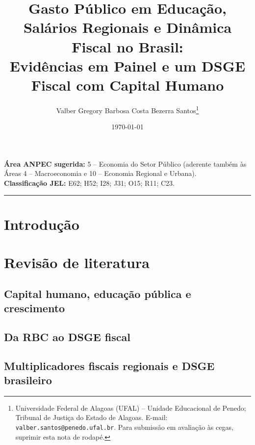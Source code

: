 \documentclass[12pt,a4paper]{article}
\title{\textbf{Gasto P\'ublico em Educa\c{c}\~ao, Sal\'arios Regionais e Din\^amica Fiscal no Brasil:}\\[2pt]
\textbf{\large Evid\^encias em Painel e um DSGE Fiscal com Capital Humano}}
\author{
Valber Gregory Barbosa Costa Bezerra Santos\thanks{Universidade Federal de Alagoas (UFAL) -- Unidade Educacional de Penedo; Tribunal de Justi\c{c}a do Estado de Alagoas. E-mail: \texttt{valber.santos@penedo.ufal.br}. Para submiss\~ao em avalia\c{c}\~ao \`as cegas, suprimir esta nota de rodap\'e.}
}
\date{\today}
\begin{document}
\maketitle

\begin{center}
\small \textbf{\'Area ANPEC sugerida:} 5 -- Economia do Setor P\'ublico (aderente tamb\'em \`as \'Areas 4 -- Macroeconomia e 10 -- Economia Regional e Urbana). \\
\textbf{Classifica\c{c}\~ao JEL:} E62; H52; I28; J31; O15; R11; C23.
\end{center}

\begin{abstract}
\end{abstract}

\begin{center}\rule{0.6\textwidth}{0.3pt}\end{center}

\section{Introdu\c{c}\~ao}

\section{Revis\~ao de literatura}
\subsection{Capital humano, educa\c{c}\~ao p\'ublica e crescimento}

\subsection{Da RBC ao DSGE fiscal}

\subsection{Multiplicadores fiscais regionais e DSGE brasileiro}
\end{document}
